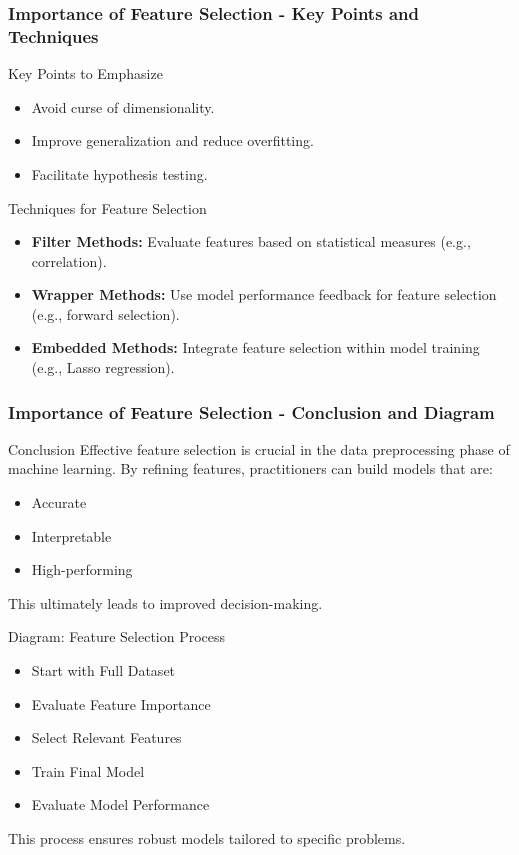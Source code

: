 \documentclass[aspectratio=169]{beamer}
\begin{document}
\begin{frame}[fragile]
    \frametitle{Importance of Feature Selection - Key Points and Techniques}
    \begin{block}{Key Points to Emphasize}
        \begin{itemize}
            \item Avoid curse of dimensionality.
            \item Improve generalization and reduce overfitting.
            \item Facilitate hypothesis testing.
        \end{itemize}
    \end{block}

    \begin{block}{Techniques for Feature Selection}
        \begin{itemize}
            \item \textbf{Filter Methods:} Evaluate features based on statistical measures (e.g., correlation).
            \item \textbf{Wrapper Methods:} Use model performance feedback for feature selection (e.g., forward selection).
            \item \textbf{Embedded Methods:} Integrate feature selection within model training (e.g., Lasso regression).
        \end{itemize}
    \end{block}
\end{frame}

\begin{frame}[fragile]
    \frametitle{Importance of Feature Selection - Conclusion and Diagram}
    \begin{block}{Conclusion}
        Effective feature selection is crucial in the data preprocessing phase of machine learning. By refining features, practitioners can build models that are:
        \begin{itemize}
            \item Accurate
            \item Interpretable
            \item High-performing
        \end{itemize}
        This ultimately leads to improved decision-making.
    \end{block}

    \begin{block}{Diagram: Feature Selection Process}
        \begin{itemize}
            \item Start with Full Dataset
            \item Evaluate Feature Importance
            \item Select Relevant Features
            \item Train Final Model
            \item Evaluate Model Performance
        \end{itemize}
        This process ensures robust models tailored to specific problems.
    \end{block}
\end{frame}
\end{document}
